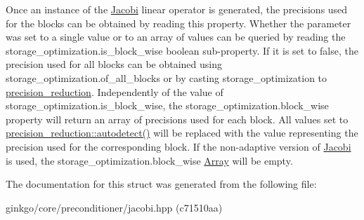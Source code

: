 Once an instance of the \hyperlink{classgko_1_1preconditioner_1_1Jacobi}{Jacobi} linear operator is generated, the precisions used for the blocks can be obtained by reading this property. Whether the parameter was set to a single value or to an array of values can be queried by reading the {\ttfamily storage\+\_\+optimization.\+is\+\_\+block\+\_\+wise} boolean sub-\/property. If it is set to {\ttfamily false}, the precision used for all blocks can be obtained using {\ttfamily storage\+\_\+optimization.\+of\+\_\+all\+\_\+blocks} or by casting {\ttfamily storage\+\_\+optimization} to {\ttfamily \hyperlink{classgko_1_1precision__reduction}{precision\+\_\+reduction}}. Independently of the value of {\ttfamily storage\+\_\+optimization.\+is\+\_\+block\+\_\+wise}, the {\ttfamily storage\+\_\+optimization.\+block\+\_\+wise} property will return an array of precisions used for each block. All values set to {\ttfamily \hyperlink{classgko_1_1precision__reduction_ac4109c61fadb24db7a1888c51ac483e9}{precision\+\_\+reduction\+::autodetect()}} will be replaced with the value representing the precision used for the corresponding block. If the non-\/adaptive version of \hyperlink{classgko_1_1preconditioner_1_1Jacobi}{Jacobi} is used, the {\ttfamily storage\+\_\+optimization.\+block\+\_\+wise} \hyperlink{classgko_1_1Array}{Array} will be empty. 

The documentation for this struct was generated from the following file\+:\begin{DoxyCompactItemize}
\item 
ginkgo/core/preconditioner/jacobi.\+hpp (c71510aa)\end{DoxyCompactItemize}
